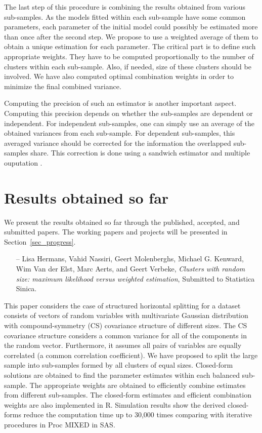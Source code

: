 \documentclass[14pt]{article}
\begin{document}
The last step of this procedure is combining the results obtained from various sub-samples. As the models fitted within each sub-sample have some common parameters, each parameter of the initial model could possibly be estimated more than once after the second step. We propose to use a weighted average of them to obtain a unique estimation for each parameter. The critical part is to define such appropriate weights. They have to be computed proportionally to the number of clusters within each sub-sample. Also, if needed, size of these clusters should be involved. We have also computed optimal combination weights in order to minimize the final combined variance.

Computing the precision of such an estimator is another important aspect. Computing this precision depends on whether the sub-samples are dependent or independent. For independent sub-samples, one can simply use an average of the obtained variances from each sub-sample. For dependent sub-samples, this averaged variance should be corrected for the information the overlapped sub-samples share. This correction is done using a sandwich estimator \citep{Verbeke2006, Verbeke2007} and multiple ouputation \citep{hoffman2001, follmann2003}.


\section{Results obtained so far}
\label{sec_results_so_far}
We present the results obtained so far through the published, accepted, and submitted papers. The working papers and projects will be presented in Section~\ref{sec_progress}.


\begin{itemize}
\item[--]{\textsf{Lisa Hermans, Vahid Nassiri, Geert Molenberghs, Michael G. Kenward, Wim Van der Elst, Marc Aerts, and Geert Verbeke}}, {\it Clusters with random size: maximum likelihood versus weighted estimation}, Submitted to Statistica Sinica.
\end{itemize}
This paper considers the case of structured horizontal splitting for a dataset consists of vectors of random variables with multivariate Gaussian distribution with compound-symmetry (CS) covariance structure of different sizes. The CS covariance structure considers a common variance for all of the components in the random vector. Furthermore, it assumes all pairs of variables are equally correlated (a common correlation coefficient). We have proposed to split the large sample into sub-samples formed by all clusters of equal sizes. Closed-form solutions are obtained to find the parameter estimates within each balanced sub-sample. The appropriate weights are obtained to efficiently combine estimates from different sub-samples. The closed-form estimates and efficient combination weights are also implemented in \textsf{R}. Simulation results show the derived closed-forms reduce the computation time up to 30,000 times comparing with iterative procedures in \textsf{Proc MIXED} in \textsf{SAS}.
\end{document}
